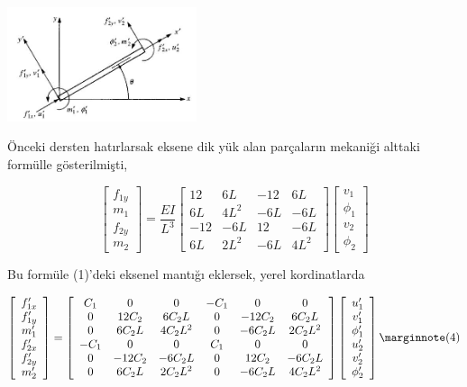 \documentclass[12pt,fleqn]{article}\usepackage{../../common}
\begin{document}
\includegraphics[width=15em]{phy_020_strs_06_02.jpg}

Önceki dersten hatırlarsak eksene dik yük alan parçaların mekaniği alttaki
formülle gösterilmişti,

$$
\left[\begin{array}{c}
f_{1y} \\ m_1 \\ f_{2y} \\ m_2
\end{array}\right] =
\frac{EI}{L^3}
\left[\begin{array}{cccc}
12 & 6L & -12 & 6L \\
6L & 4L^2 & -6L & -6L \\
-12 & -6L & 12 & -6L \\
6L & 2L^2 & -6L & 4L^2
\end{array}\right]
\left[\begin{array}{ccc}
v_1 \\ \phi_1 \\ v_2 \\ \phi_2
\end{array}\right]
$$

Bu formüle (1)'deki eksenel mantığı eklersek, yerel kordinatlarda

$$
\left[\begin{array}{c}
f'_{1x} \\ f'_{1y} \\ m'_1 \\ f'_{2x} \\ f'_{2y} \\ m'_2
\end{array}\right] =
\left[\begin{array}{cccccc}
C_1 & 0 & 0 & -C_1 & 0 & 0 \\
0 & 12C_2 & 6 C_2 L & 0 & -12 C_2 & 6 C_2 L \\
0 & 6C_2 L & 4 C_2 L^2 & 0 & -6 C_2 L & 2 C_2 L^2 \\
-C_1 & 0 & 0 & C_1 & 0 & 0 \\
0 & -12C_2 & -6 C_2 L & 0 & 12 C_2 & -6 C_2 L \\
0 & 6 C_2 L & 2 C_2 L^2 & 0 & -6C_2 L & 4C_2 L^2
\end{array}\right]
\left[\begin{array}{c}
u'_1 \\ v'_1 \\ \phi'_1 \\ u'_2 \\ v'_2 \\ \phi'_2
\end{array}\right]
\mlabel{4}
$$
\end{document}
